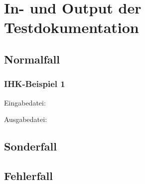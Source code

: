 \chapter{In- und Output der Testdokumentation}
\label{InOutput}
\section{Normalfall}
\subsection{IHK-Beispiel 1}
Eingabedatei:
%

Ausgabedatei:
%
\clearpage
\section{Sonderfall}

\clearpage
\section{Fehlerfall}

\cleardoublepage